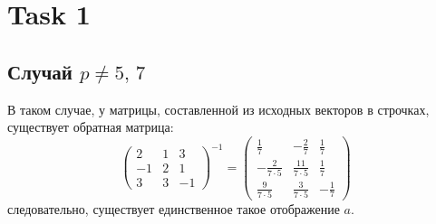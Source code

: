 \section{Task 1}
\subsection{Случай $p\ne 5,\,7$}
В таком случае, у матрицы, составленной из исходных векторов в строчках, существует обратная матрица:
\begin{equation}
    \begin{pmatrix}
        2 & 1 & 3 \\
        -1 & 2 & 1 \\
        3 & 3 & -1
    \end{pmatrix}^{-1} = 
    \begin{pmatrix}
        \frac17 & -\frac{2}{7} & \frac17 \\
        -\frac{2}{7\cdot 5} & \frac{11}{7\cdot 5} & \frac{1}{7} \\
        \frac{9}{7\cdot 5} & \frac{3}{7\cdot 5} & -\frac{1}{7}
    \end{pmatrix}
\end{equation}
следовательно, существует единственное такое отображение $a$.

